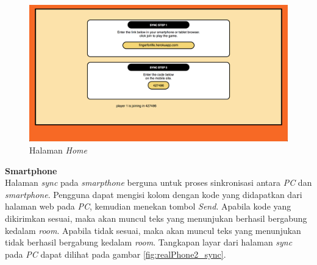 \begin{enumerate}
	\begin{figure}[H]
		\centering
		\includegraphics[scale=0.25]{Gambar/realWeb2_sync}
		\caption{Halaman \textit{Home}}
		\label{fig:realWeb2_sync}
	\end{figure}
	
	
	\textbf{Smartphone} \\
	Halaman \textit{sync} pada \textit{smarpthone} berguna untuk proses sinkronisasi antara \textit{PC} dan \textit{smartphone}. Pengguna dapat mengisi kolom dengan kode yang didapatkan dari halaman web pada \textit{PC}, kemudian menekan tombol \textit{Send}. Apabila kode yang dikirimkan sesuai, maka akan muncul teks yang menunjukan berhasil bergabung kedalam \textit{room}. Apabila tidak sesuai, maka akan muncul teks yang menunjukan tidak berhasil bergabung kedalam \textit{room}. Tangkapan layar dari halaman \textit{sync} pada \textit{PC} dapat dilihat pada gambar \ref{fig:realPhone2_sync}.
	

\end{enumerate}
